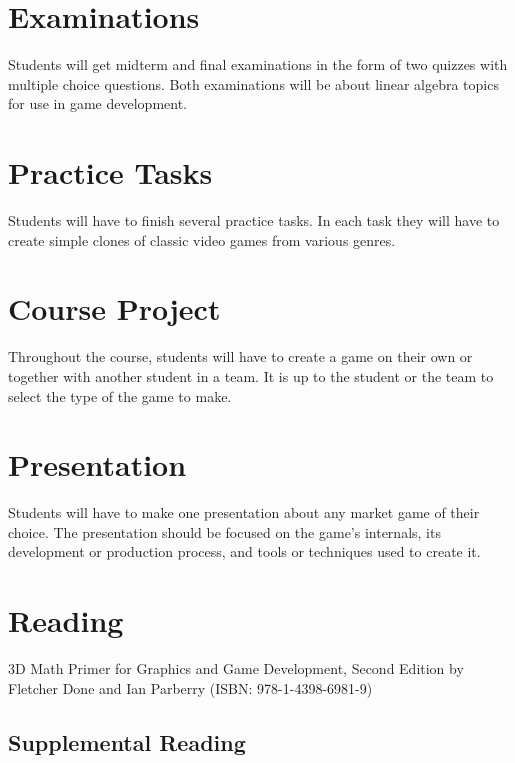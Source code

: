 \documentclass[12pt,a4paper,oneside]{article}
\begin{document}
    \section{Examinations}

        Students will get midterm and final examinations in the form of two
        quizzes with multiple choice questions. Both examinations will be about
        linear algebra topics for use in game development.

    \section{Practice Tasks}

        Students will have to finish several practice tasks. In each task they
        will have to create simple clones of classic video games from various
        genres.

    \section{Course Project}

        Throughout the course, students will have to create a game on their own
        or together with another student in a team. It is up to the student or
        the team to select the type of the game to make.

    \section{Presentation}

        Students will have to make one presentation about any market game of
        their choice. The presentation should be focused on the game's
        internals, its development or production process, and tools or
        techniques used to create it.

    \section{Reading}

        3D Math Primer for Graphics and Game Development, Second Edition by
        Fletcher Done and Ian Parberry (ISBN: 978-1-4398-6981-9)

        \subsection{Supplemental Reading}
\end{document}
